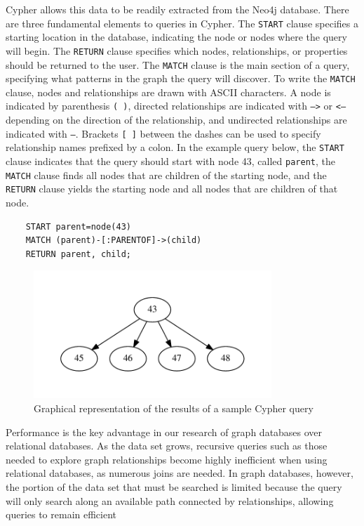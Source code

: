 Cypher%
 allows this data to be readily extracted from the Neo4j database. There are three fundamental elements to queries in Cypher. The \texttt{START} clause specifies a starting location in the database, indicating the node or nodes where the query will begin. The \texttt{RETURN} clause specifies which nodes, relationships, or properties should be returned to the user. The \texttt{MATCH} clause is the main section of a query, specifying what patterns in the graph the query will discover. To write the \texttt{MATCH} clause, nodes and relationships are drawn with ASCII characters. A node is indicated by parenthesis \texttt{( )}, directed relationships are indicated with \texttt{-->} or \texttt{<--} depending on the direction of the relationship, and undirected relationships are indicated with \texttt{--}. Brackets \texttt{[ ]} between the dashes can be used to specify relationship names prefixed by a colon. In the example query below, the \texttt{START} clause indicates that the query should start with node 43, called \texttt{parent}, the \texttt{MATCH} clause finds all nodes that are children of the starting node, and the \texttt{RETURN} clause yields the starting node and all nodes that are children of that node.

\begin{verbatim}
    START parent=node(43)
    MATCH (parent)-[:PARENTOF]->(child)
    RETURN parent, child;
\end{verbatim}

\begin{figure}[tb]
 \sidecaption[t]
 \includegraphics[width=0.8\textwidth]{figures/sample_neo4j_query.pdf}
 \caption{Graphical representation of the results of a sample Cypher query}
 \label{fig:exampleQuery}
\end{figure}

Performance is the key advantage in our research of graph databases over relational databases. As the data set grows, recursive queries such as those needed to explore graph relationships become highly inefficient when using relational databases, as numerous joins are needed. In graph databases, however, the portion of the data set that must be searched is limited because the query will only search along an available path connected by relationships, allowing queries to remain efficient~%


